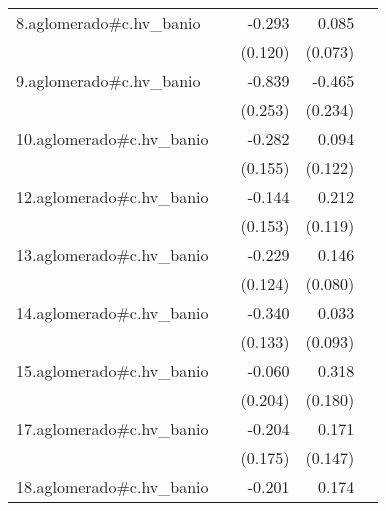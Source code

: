 {\begin{longtable}{l*{4}{D{.}{.}{-1}}}
\addlinespace
8.aglomerado#c.hv\_banio&                     &      -0.293\sym{*}  &       0.085         &                     \\
            &                     &     (0.120)         &     (0.073)         &                     \\
\addlinespace
9.aglomerado#c.hv\_banio&                     &      -0.839\sym{***}&      -0.465\sym{*}  &                     \\
            &                     &     (0.253)         &     (0.234)         &                     \\
\addlinespace
10.aglomerado#c.hv\_banio&                     &      -0.282         &       0.094         &                     \\
            &                     &     (0.155)         &     (0.122)         &                     \\
\addlinespace
12.aglomerado#c.hv\_banio&                     &      -0.144         &       0.212         &                     \\
            &                     &     (0.153)         &     (0.119)         &                     \\
\addlinespace
13.aglomerado#c.hv\_banio&                     &      -0.229         &       0.146         &                     \\
            &                     &     (0.124)         &     (0.080)         &                     \\
\addlinespace
14.aglomerado#c.hv\_banio&                     &      -0.340\sym{*}  &       0.033         &                     \\
            &                     &     (0.133)         &     (0.093)         &                     \\
\addlinespace
15.aglomerado#c.hv\_banio&                     &      -0.060         &       0.318         &                     \\
            &                     &     (0.204)         &     (0.180)         &                     \\
\addlinespace
17.aglomerado#c.hv\_banio&                     &      -0.204         &       0.171         &                     \\
            &                     &     (0.175)         &     (0.147)         &                     \\
\addlinespace
18.aglomerado#c.hv\_banio&                     &      -0.201         &       0.174\sym{**} &                     \\

\end{longtable}}
